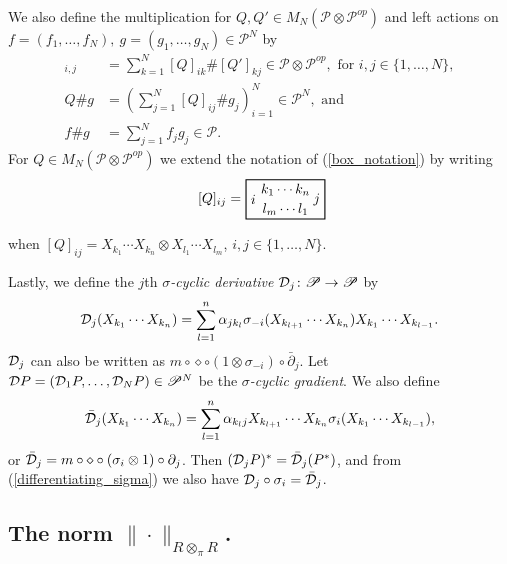 We also define the multiplication for $Q,Q'\in M_N(\mathscr{P}\otimes\mathscr{P}^{op})$ and left actions on $f=(f_1,\ldots, f_N),\ g=(g_1,\ldots, g_N)\in \mathscr{P}^N$ by
	\begin{align*}
		[Q\# Q']_{i,j} &= \sum_{k=1}^N [Q]_{ik}\#[Q']_{kj} \in \mathscr{P}\otimes\mathscr{P}^{op},\text{ for }i,j\in\{1,\ldots, N\},\\
		Q\# g&= \left( \sum_{j=1}^N [Q]_{ij}\# g_j\right)_{i=1}^N \in \mathscr{P}^N,\text{ and}\\
		f\# g &= \sum_{j=1}^N f_jg_j \in \mathscr{P}.
	\end{align*}
For $Q\in M_N(\mathscr{P}\otimes\mathscr{P}^{op})$ we extend the notation of (\ref{box_notation}) by writing
	\begin{align*}
	\begin{tikzpicture}
	\draw[thick] (0,0) rectangle (2,1);
	\node[left] at (0,.5) {$[Q]_{ij}=$};
	\node at (1,.75) {$k_1\cdots k_n$};
	\node at (1,.25) {$l_m\cdots l_1$};
	\node[right] at (0,.5) {$i$};
	\node[left] at (2,.5) {$j$};
    	\end{tikzpicture}
	\end{align*}
when $[Q]_{ij}=X_{k_1}\cdots X_{k_n}\otimes X_{l_1}\cdots X_{l_m}$, $i,j\in\{1,\ldots, N\}$.

Lastly, we define the $j$th \textit{$\sigma$-cyclic derivative} $\mathcal D_j\colon\mathscr{P}\rightarrow\mathscr{P}$ by
	\begin{equation*}
		\mathcal D_j(X_{k_1}\cdots X_{k_n})= \sum_{l=1}^n \alpha_{j k_l} \sigma_{-i}(X_{k_{l+1}}\cdots X_{k_n})X_{k_1}\cdots X_{k_{l-1}}.
	\end{equation*}
$\mathcal D_j$ can also be written as $m\circ\diamond\circ(1\otimes\sigma_{-i})\circ\bar{\partial}_j$. Let $\mathcal D P=(\mathcal D_1 P,\ldots, \mathcal D_N P)\in\mathscr{P}^N$ be the \textit{$\sigma$-cyclic gradient}. We also define
	\begin{align*}
		\bar{\mathcal D}_j(X_{k_1}\cdots X_{k_n})= \sum_{l=1}^n \alpha_{k_l j} X_{k_{l+1}}\cdots X_{k_n}\sigma_i(X_{k_1}\cdots X_{k_{l-1}}),
	\end{align*}
or $\bar{\mathcal D}_j=m\circ\diamond\circ(\sigma_i\otimes 1)\circ\partial_j$. Then $(\mathcal D_j P)^*=\bar{\mathcal D}_j (P^*)$, and from (\ref{differentiating_sigma}) we also have $\mathcal D_j\circ\sigma_i=\bar{\mathcal D}_j$.



\subsection{The norm $\|\cdot\|_{R\otimes_\pi R}$.}\label{projective_tensor_norm}

